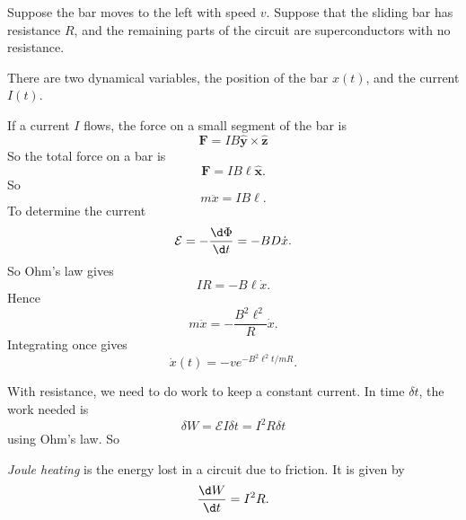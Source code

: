 \documentclass[a4paper]{article}
\begin{document}
\begin{eg}\leavevmode
  \begin{center}
  \end{center}
  Suppose the bar moves to the left with speed $v$. Suppose that the sliding bar has resistance $R$, and the remaining parts of the circuit are superconductors with no resistance.

  There are two dynamical variables, the position of the bar $x(t)$, and the current $I(t)$.

  If a current $I$ flows, the force on a small segment of the bar is
  \[
    \mathbf{F} = IB \hat{\mathbf{y}}\times \hat{\mathbf{z}}
  \]
  So the total force on a bar is
  \[
    \mathbf{F} = IB\ell\hat{\mathbf{x}}.
  \]
  So
  \[
    m\ddot{x} = IB\ell.
  \]
  To determine the current
  \[
    \mathcal{E} = -\frac{\d \Phi}{\d t} = -BD\dot{x}.
  \]
  So Ohm's law gives
  \[
    IR = -B\ell\dot{x}.
  \]
  Hence
  \[
    m\ddot{x} = -\frac{B^2\ell^2}{R}\dot{x}.
  \]
  Integrating once gives
  \[
    \dot{x}(t) = -ve^{-B^2\ell^2t/mR}.
  \]
\end{eg}
With resistance, we need to do work to keep a constant current. In time $\delta t$, the work needed is
\[
  \delta W = \mathcal{E} I\delta t = I^2 R \delta t
\]
using Ohm's law. So
\begin{defi}
  \emph{Joule heating} is the energy lost in a circuit due to friction. It is given by
  \[
    \frac{\d W}{\d t} = I^2 R.
  \]
\end{defi}
\end{document}
